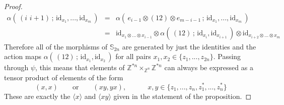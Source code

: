 \documentclass{amsbook} %
\numberwithin{section}{chapter}
\begin{document}
\begin{proof}
\[ \begin{array}{rll}
			\alpha( \, (i \, \, i+1) \, ; \, \mathrm{id}_{x_1}, ..., \mathrm{id}_{x_m} \, ) & = & \alpha( \, e_{i-1} \otimes (1 2) \otimes e_{m-i-1} \, ; \,  \mathrm{id}_{x_1}, ..., \mathrm{id}_{x_m} \, ) \\
			& = & \mathrm{id}_{x_1 \otimes ... \otimes x_{i-1}} \otimes \alpha( \, (1 2) \, ; \, \mathrm{id}_{x_i}, \mathrm{id}_{x_{i+1}} \, ) \otimes \mathrm{id}_{x_{i+2} \otimes ... \otimes x_m}
		\end{array}
\]
Therefore all of the morphisms of $\mathbb{S}_{2n}$ are generated by just the identities and the action maps $\alpha( \, (1 2) \, ; \, \mathrm{id}_{x_1}, \mathrm{id}_{x_2} \, )$ for all pairs $x_1, x_2 \in \{z_1, ..., z_{2n} \}$. Passing through $\psi$, this means that elements of $\mathbb{Z}^{\ast n} \times_{\mathbb{Z}^n} \mathbb{Z}^{\ast n}$ can always be expressed as a tensor product of elements of the form
\[ (x, x) \quad \quad \text{or} \quad \quad (x y, y x), \quad \quad \quad x, y \in \{z_1, ..., z_n, z_1^*, ..., z_n^* \} \]
These are exactly the $\langle x \rangle$ and $\langle xy \rangle$ given in the statement of the proposition.


\end{proof}
\end{document}
